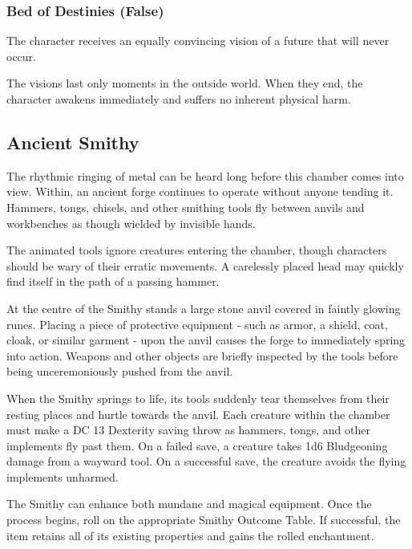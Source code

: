 \subsubsection*{ Bed of Destinies (False)}
{\entryfont The character receives an equally convincing vision of a future that will never occur.}

{\entryfont The visions last only moments in the outside world. When they end, the character awakens immediately and suffers no inherent physical harm.}

\subsection*{ Ancient Smithy}
{The rhythmic ringing of metal can be heard long before this chamber comes into view. Within, an ancient forge continues to operate without anyone tending it. Hammers, tongs, chisels, and other smithing tools fly between anvils and workbenches as though wielded by invisible hands.

The animated tools ignore creatures entering the chamber, though characters should be wary of their erratic movements. A carelessly placed head may quickly find itself in the path of a passing hammer.

At the centre of the Smithy stands a large stone anvil covered in faintly glowing runes. Placing a piece of protective equipment - such as armor, a shield, coat, cloak, or similar garment - upon the anvil causes the forge to immediately spring into action. Weapons and other objects are briefly inspected by the tools before being unceremoniously pushed from the anvil.

When the Smithy springs to life, its tools suddenly tear themselves from their resting places and hurtle towards the anvil. Each creature within the chamber must make a DC 13 Dexterity saving throw as hammers, tongs, and other implements fly past them. On a failed save, a creature takes 1d6 Bludgeoning damage from a wayward tool. On a successful save, the creature avoids the flying implements unharmed.

The Smithy can enhance both mundane and magical equipment. Once the process begins, roll on the appropriate Smithy Outcome Table. If successful, the item retains all of its existing properties and gains the rolled enchantment.}

